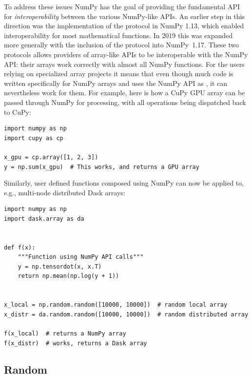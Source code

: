 To address these issues NumPy has the goal of providing the fundamental
API for \emph{interoperability} between the various NumPy-like APIs.
An earlier step in this direction was the implementation of the
 protocol in NumPy 1.13, which enabled interoperability
for most mathematical functions.\cite{NEP13}
In 2019 this was expanded more generally with the inclusion of the
 protocol into NumPy~1.17.
These two protocols allows providers of array-like APIs to be interoperable
with the NumPy API: their arrays work correctly with almost all NumPy functions.\cite{NEP18}
For the users relying on specialized array projects it means that even though
much code is written specifically for NumPy arrays and uses the NumPy API as
, it can nevertheless work for them.  For
example, here is how a CuPy GPU array can be passed through NumPy for
processing, with all operations being dispatched back to CuPy:

\begin{lstlisting}
import numpy as np
import cupy as cp

x_gpu = cp.array([1, 2, 3])
y = np.sum(x_gpu)  # This works, and returns a GPU array
\end{lstlisting}


Similarly, user defined functions composed using NumPy can now be
applied to, e.g., multi-node distributed Dask arrays:

\begin{lstlisting}
import numpy as np
import dask.array as da


def f(x):
    """Function using NumPy API calls"""
    y = np.tensordot(x, x.T)
    return np.mean(np.log(y + 1))


x_local = np.random.random([10000, 10000])  # random local array
x_distr = da.random.random([10000, 10000])  # random distributed array

f(x_local)  # returns a NumPy array
f(x_distr)  # works, returns a Dask array
\end{lstlisting}

\subsection{Random}


